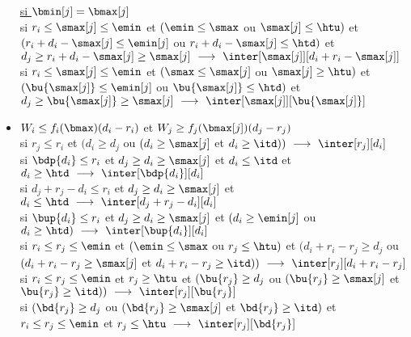 \documentclass{report}
\begin{document}
\begin{itemize}
  \underline{si $\bmin[j]=\bmax[j]$}\\
  \vspace{0.2cm}
  si $r_i \le \smax[j] \le \emin$ et $(\emin \le \smax$ ou $\smax[j] \le \htu)$ 
  et $(r_i+d_i-\smax[j] \le \emin[j]$ ou $r_i+d_i-\smax[j] \le \htd)$ et 
  $d_j \ge r_i+d_i-\smax[j] \ge \smax[j]\ \longrightarrow\ 
  \inter[{\smax[j]}][{d_i+r_i-\smax[j]}]$\\
  \vspace{0.1cm}
  si $r_i \le \smax[j] \le \emin$ et 
  $(\smax \le \smax[j]$ ou $\smax[j] \ge \htu)$ et  
  $(\bu{\smax[j]} \le \emin[j]$ ou $\bu{\smax[j]} \le \htd)$ et \linebreak
  $d_j \ge \bu{\smax[j]} \ge \smax[j]\ \longrightarrow\ 
  \inter[{\smax[j]} ][\bu{\smax[j]}]$\\

  \vspace{0.5cm}

\item $W_i\le f_i(\bmax)(d_i-r_i)$ et $W_j \ge f_j(\bmax[j])(d_j-r_j)$\\
  \vspace{0.2cm}
  si $r_j \le r_i$ et $(d_i \ge d_j$ ou $(d_i \ge \smax[j]$ et $d_i \ge \itd))\ 
  \longrightarrow\ \inter[r_j][d_i]$\\
  \vspace{0.1cm}
  si $\bdp{d_i} \le r_i$ et $d_j \ge d_i \ge \smax[j]$ et $d_i \le \itd$ et  $d_i \ge \htd\ \longrightarrow\ 
  \inter[\bdp{d_i}][d_i]$\\
  \vspace{0.1cm}
  si $d_j+r_j-d_i \le r_i$ et $d_j \ge d_i \ge \smax[j]$ et 
  $d_i\le \htd\ \longrightarrow\ \inter[d_j+r_j-d_i][d_i]$\\
  \vspace{0.1cm}
  si $\bup{d_i} \le r_i$ et $d_j \ge d_i \ge \smax[j]$ et $(d_i \ge \emin[j]$ ou  $d_i \ge \htd)\ \longrightarrow\ 
  \inter[\bup{d_i}][d_i]$\\
  \vspace{0.1cm}
  si $r_i \le r_j \le \emin$ et $(\emin \le \smax$ ou $r_j\le \htu)$ et 
  $(d_i+r_i-r_j \ge d_j$ ou $(d_i+r_i-r_j \ge \smax[j]$ et 
  $d_i+r_i-r_j \ge \itd))\ 
  \longrightarrow\ \inter[r_j][d_i+r_i-r_j]$\\
  \vspace{0.1cm}
  si $r_i \le r_j \le \emin$ et $ r_j \ge \htu$ et   $(\bu{r_j} \ge d_j$ ou $(\bu{r_j} \ge \smax[j]$ et  
  $\bu{r_j} \ge \itd))\ \longrightarrow\ \inter[r_j][\bu{r_j}]$\\
  \vspace{0.1cm}
  si  $(\bd{r_j} \ge d_j$ ou $(\bd{r_j} \ge \smax[j]$ et  
  $\bd{r_j} \ge \itd)$ et $r_i \le r_j \le \emin$ et $r_j \le \htu\ \longrightarrow\ 
  \inter[r_j][\bd{r_j}]$\\
  \vspace{0.25cm}


\end{itemize}
\end{document}
